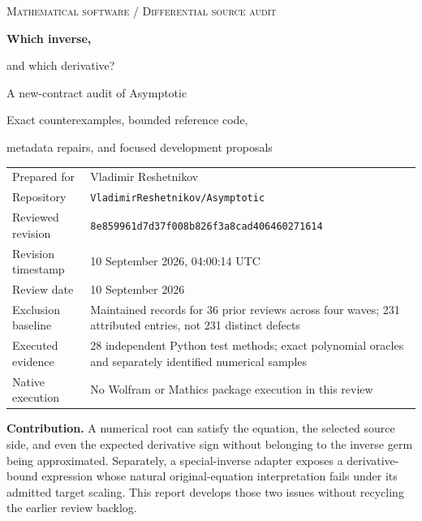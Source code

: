 \documentclass[11pt,letterpaper]{article}
\newcommand{\code}[1]{{\small\nolinkurl{#1}}}
\newcommand{\SHA}{8e859961d7d37f008b826f3a8cad406460271614}
\begin{document}
\begin{titlepage}
\thispagestyle{empty}
\vspace*{0.5in}
{\large\color{muted}\textsc{Mathematical software / Differential source audit}}\par
\vspace{0.35in}
{\Huge\bfseries\color{ink}Which inverse,\par and which derivative?}\par
\vspace{0.3in}
{\LARGE A new-contract audit of Asymptotic}\par
\vspace{0.25in}
{\large Exact counterexamples, bounded reference code,\par metadata repairs, and focused development proposals}\par
\vspace{0.5in}
\begin{tabularx}{\linewidth}{@{}lY@{}}
Prepared for & Vladimir Reshetnikov\\[6pt]
Repository & \code{VladimirReshetnikov/Asymptotic}\\[6pt]
Reviewed revision & \texttt{\SHA}\\[6pt]
Revision timestamp & 10 September 2026, 04:00:14 UTC\\[6pt]
Review date & 10 September 2026\\[6pt]
Exclusion baseline & Maintained records for 36 prior reviews across four waves; 231 attributed entries, not 231 distinct defects\\[6pt]
Executed evidence & 28 independent Python test methods; exact polynomial oracles and separately identified numerical samples\\[6pt]
Native execution & No Wolfram or Mathics package execution in this review
\end{tabularx}
\vfill
\textbf{Contribution.} A numerical root can satisfy the equation, the selected source side, and even the expected derivative sign without belonging to the inverse germ being approximated. Separately, a special-inverse adapter exposes a derivative-bound expression whose natural original-equation interpretation fails under its admitted target scaling. This report develops those two issues without recycling the earlier review backlog.
\end{titlepage}
\end{document}
